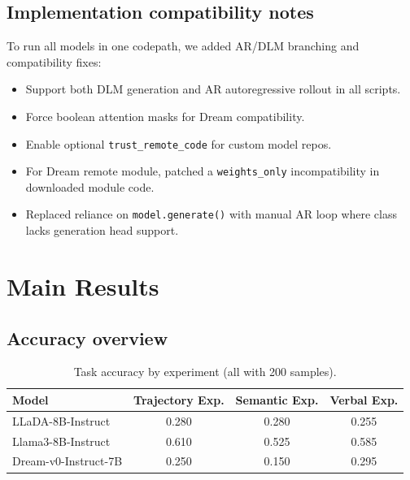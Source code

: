 \documentclass{article}
\begin{document}
\subsection{Implementation compatibility notes}
To run all models in one codepath, we added AR/DLM branching and compatibility fixes:
\begin{itemize}
\item Support both DLM generation and AR autoregressive rollout in all scripts.
\item Force boolean attention masks for Dream compatibility.
\item Enable optional \texttt{trust\_remote\_code} for custom model repos.
\item For Dream remote module, patched a \texttt{weights\_only} incompatibility in downloaded module code.
\item Replaced reliance on \texttt{model.generate()} with manual AR loop where class lacks generation head support.
\end{itemize}

\section{Main Results}

\subsection{Accuracy overview}
\begin{table}[h]
\centering
\caption{Task accuracy by experiment (all with 200 samples).}
\label{tab:acc}
\begin{tabular}{lccc}
\toprule
Model & Trajectory Exp. & Semantic Exp. & Verbal Exp. \\
\midrule
LLaDA-8B-Instruct & 0.280 & 0.280 & 0.255 \\
Llama3-8B-Instruct & 0.610 & 0.525 & 0.585 \\
Dream-v0-Instruct-7B & 0.250 & 0.150 & 0.295 \\
\bottomrule
\end{tabular}
\end{table}
\end{document}
